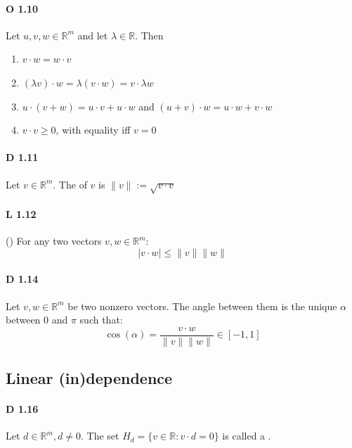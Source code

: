 \paragraph{O 1.10} Let $u,v,w\in\mathbb{R}^m$
and let $\lambda\in\mathbb{R}$. Then
\begin{enumerate}
    \item $v\cdot w=w\cdot v$

    \item $(\lambda v)\cdot w=\lambda(v\cdot w)=v\cdot\lambda w$

    \item $u\cdot(v+w) = u\cdot v+u\cdot w$ and
        $(u+v)\cdot w = u\cdot w+v\cdot w$

    \item $v\cdot v\geq0$, with equality iff $v=0$
\end{enumerate}

\paragraph{D 1.11} Let $v\in\mathbb{R}^m$. The  of $v$ is $\lVert v \rVert := \sqrt{v\cdot v}$

\paragraph{L 1.12} () For any two vectors
$v,w\in\mathbb{R}^m$:
\begin{equation*}
    \lvert v\cdot w \rvert\le \lVert v \rVert \lVert w \rVert
\end{equation*}

\paragraph{D 1.14} Let $v,w\in\mathbb{R}^m$ be two nonzero
vectors. The angle between them is the unique $\alpha$ between $0$ and $\pi$
such that:
\begin{equation*}
    \cos(\alpha) = \frac{v\cdot w}{\lVert v\rVert\lVert w\rVert}\in[-1,1]
\end{equation*}

\subsection{Linear (in)dependence}

\paragraph{D 1.16} Let $d \in \mathbb{R}^m, d\ne 0$. The set $H_d=\{v\in \mathbb{R}:v \cdot d = 0 \}$ is called a .

